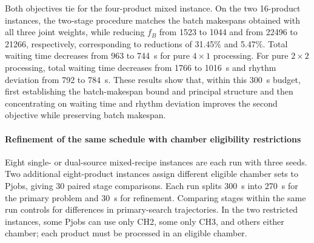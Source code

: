 \documentclass[final,5p,times,twocolumn]{elsarticle}
\begin{document}
Both objectives tie for the four-product mixed instance. On the two 16-product instances, the two-stage procedure matches the batch makespans obtained with all three joint weights, while reducing $f_B$ from 1523 to 1044 and from 22496 to 21266, respectively, corresponding to reductions of 31.45\% and 5.47\%. Total waiting time decreases from 963 to 744~s for pure $4\times1$ processing. For pure $2\times2$ processing, total waiting time decreases from 1766 to 1016~s and rhythm deviation from 792 to 784~s. These results show that, within this 300~s budget, first establishing the batch-makespan bound and principal structure and then concentrating on waiting time and rhythm deviation improves the second objective while preserving batch makespan.

\paragraph{Refinement of the same schedule with chamber eligibility restrictions}
Eight single- or dual-source mixed-recipe instances are each run with three seeds. Two additional eight-product instances assign different eligible chamber sets to Pjobs, giving 30 paired stage comparisons. Each run splits 300~s into 270~s for the primary problem and 30~s for refinement. Comparing stages within the same run controls for differences in primary-search trajectories. In the two restricted instances, some Pjobs can use only CH2, some only CH3, and others either chamber; each product must be processed in an eligible chamber.


\begin{table}[!htbp]
\centering\small
\caption{Timing refinement of the same schedule (three-seed means, s)}
\label{tab:refinement-ablation-cn}
\end{table}
\end{document}
